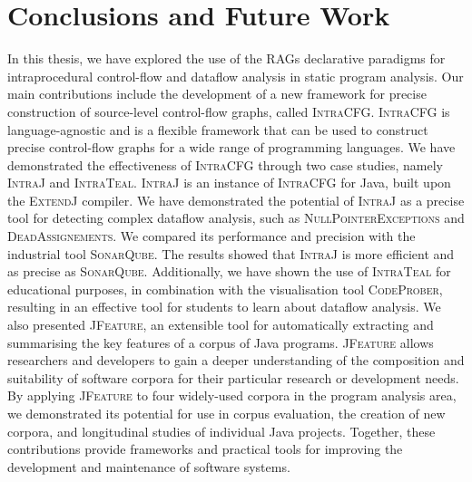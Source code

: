 \section{Conclusions and Future Work}%
\label{sec:kappa:conclusions}%
In this thesis, we have explored the use of the RAGs declarative paradigms for
intraprocedural control-flow and dataflow analysis in static program analysis. Our main contributions include the
development of a new framework for precise construction of source-level
control-flow graphs, called \textsc{IntraCFG}.
\textsc{IntraCFG} is language-agnostic and is a flexible framework that can be used to
construct precise control-flow graphs for a wide range of programming languages.
We have demonstrated the effectiveness of \textsc{IntraCFG} through two case studies,
namely \textsc{IntraJ} and \textsc{IntraTeal}.
\textsc{IntraJ} is an instance of \textsc{IntraCFG} for Java, 
built upon the \textsc{ExtendJ} compiler.
We have demonstrated the potential of \textsc{IntraJ} as a precise tool
for detecting complex dataflow analysis, such as \textsc{NullPointerExceptions} and \textsc{DeadAssignements}.
We compared its performance and precision with the industrial tool \textsc{SonarQube}. 
The results showed that \textsc{IntraJ} is more efficient and as precise as \textsc{SonarQube}.
Additionally, we have shown the use of \textsc{IntraTeal}
for educational purposes, in combination with the visualisation tool \textsc{CodeProber},
resulting in an effective tool for students to learn about dataflow analysis.
We also presented  \textsc{JFeature}, an extensible tool for automatically
extracting and summarising the key features of a corpus of Java programs.
\textsc{JFeature} allows researchers and developers to gain a deeper understanding of the composition and
suitability of software corpora for their particular research or development needs.
By applying \textsc{JFeature} to four widely-used corpora in the program analysis area,
we demonstrated its potential for use in corpus evaluation, the creation of new
corpora, and longitudinal studies of individual Java projects.
Together, these contributions provide frameworks and practical tools
for improving the development and maintenance of software systems.


